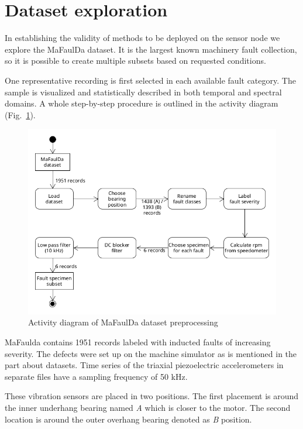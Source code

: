 \section{Dataset exploration}
In establishing the validity of methods to be deployed on the sensor node we explore the MaFaulDa dataset. It is the largest known machinery fault collection, so it is possible to create multiple subsets based on requested conditions. 

One representative recording is first selected in each available fault category. The sample is visualized and statistically described in both temporal and spectral domains. A whole step-by-step procedure is outlined in the activity diagram (Fig.~\ref{fig:design:mafaulda-preprocessing}).

\begin{figure}[ht]
	\centering
	\includegraphics[width=\textwidth]{assets/design/activity-data-exploration.png}
	\caption{Activity diagram of MaFaulDa dataset preprocessing}
	\label{fig:design:mafaulda-preprocessing}
\end{figure}

MaFaulda contains 1951 records labeled with inducted faults of increasing severity. The defects were set up on the machine simulator as is mentioned in the part about datasets. Time series of the triaxial piezoelectric accelerometers in separate files have a sampling frequency of 50 kHz. 

These vibration sensors are placed in two positions. The first placement is around the inner underhang bearing named \emph{A} which is closer to the motor. The second location is around the outer overhang bearing denoted as \emph{B} position.

